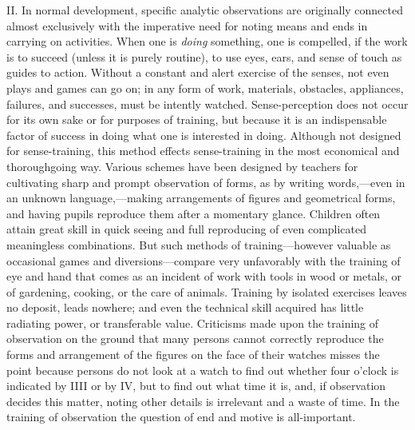 \documentclass[showtrims,ustradepaper]{memoir}
\begin{document}
II. In normal development, specific analytic observations are originally
connected almost exclusively with the imperative need for noting means
and ends in carrying on activities. When one is \emph{doing} something,
one is compelled, if the work is to succeed (unless it is purely
routine), to use eyes, ears, and sense of touch as guides to action.
Without a constant and alert exercise of the senses, not even plays and
games can go on; in any form of work, materials, obstacles, appliances,
failures, and successes, must be intently watched. Sense-perception does
not occur for its own sake or for purposes of training, but because it
is an indispensable factor of success in doing what one is interested in
doing. Although not designed for sense-training, this method effects
sense-training in the most economical and thoroughgoing way. Various
schemes have been designed by teachers for cultivating sharp and prompt
observation of forms, as by writing words,---even in an unknown
language,---making arrangements of figures and geometrical forms, and
having pupils reproduce them after a momentary glance. Children often
attain great skill in quick seeing and full reproducing of even
complicated meaningless combinations. But such methods of
training---however
valuable as occasional games and diversions---compare very unfavorably
with the training of eye and hand that comes as an incident of work with
tools in wood or metals, or of gardening, cooking, or the care of
animals. Training by isolated exercises leaves no deposit, leads
nowhere; and even the technical skill acquired has little radiating
power, or transferable value. Criticisms made upon the training of
observation on the ground that many persons cannot correctly reproduce
the forms and arrangement of the figures on the face of their watches
misses the point because persons do not look at a watch to find out
whether four o'clock is indicated by IIII or by IV, but to find out what
time it is, and, if observation decides this matter, noting other
details is irrelevant and a waste of time. In the training of
observation the question of end and motive is all-important.


\end{document}
